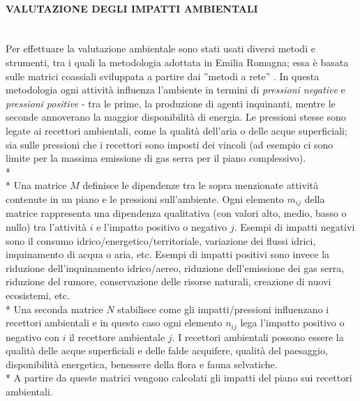 \documentclass[12pt,a4paper,openright,twoside]{report}
\newcommand{\myparagraph}[1]{\paragraph{#1}\mbox{}\\}
\begin{document}
\myparagraph{VALUTAZIONE DEGLI IMPATTI AMBIENTALI}
Per effettuare la valutazione ambientale sono stati usati diversi metodi e strumenti, tra i quali la metodologia adottata in Emilia Romagna; essa è basata sulle matrici coassiali \cite{coaxMatr} sviluppata a partire dai ''metodi a rete'' \cite{networkMethod}. In questa metodologia ogni attività influenza l'ambiente  in termini di \emph{pressioni negative} e \emph{pressioni positive} - tra le prime, la produzione di agenti inquinanti, mentre le seconde annoverano la maggior disponibilità di energia. Le pressioni stesse sono legate ai recettori ambientali, come la qualità dell'aria o delle acque superficiali; sia sulle pressioni che i recettori sono imposti dei vincoli (ad esempio ci sono limite per la massima emissione di gas serra per il piano complessivo).\\*\\*
Una matrice $M$ definisce le dipendenze tra le sopra menzionate attività contenute in un piano e le pressioni sull'ambiente. Ogni elemento $m_{ij}$ della matrice rappresenta una dipendenza qualitativa (con valori alto, medio, basso o nullo) tra l'attività $i$ e l'impatto positivo o negativo $j$. Esempi di impatti negativi sono il consumo idrico/energetico/territoriale, variazione dei flussi idrici, inquinamento di acqua o aria, etc. Esempi di impatti positivi sono invece la riduzione dell'inquinamento idrico/aereo, riduzione dell'emissione dei gas serra, riduzione del rumore, conservazione delle risorse naturali, creazione di nuovi ecosistemi, etc.\\*
Una seconda matrice $N$ stabilisce come gli impatti/pressioni influenzano i recettori ambientali e in questo caso ogni elemento $n_{ij}$ lega l'impatto positivo o negativo con $i$ il recettore ambientale $j$. I recettori ambientali possono essere la qualità delle acque superficiali e delle falde acquifere, qualità del paesaggio, disponibilità energetica, benessere della flora e fauna selvatiche.\\*
A partire da queste matrici vengono calcolati gli impatti del piano sui recettori ambientali.
\end{document}
